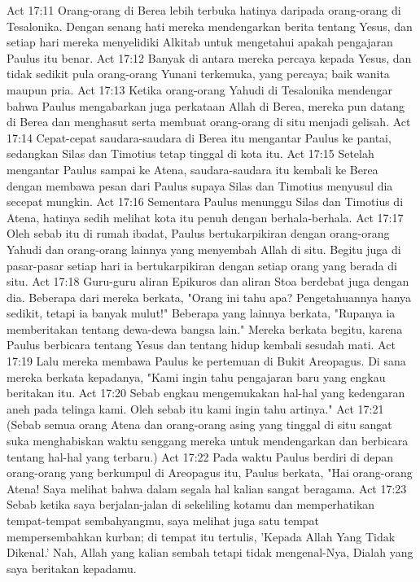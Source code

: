 Act 17:11  Orang-orang di Berea lebih terbuka hatinya daripada orang-orang di Tesalonika. Dengan senang hati mereka mendengarkan berita tentang Yesus, dan setiap hari mereka menyelidiki Alkitab untuk mengetahui apakah pengajaran Paulus itu benar.
Act 17:12  Banyak di antara mereka percaya kepada Yesus, dan tidak sedikit pula orang-orang Yunani terkemuka, yang percaya; baik wanita maupun pria.
Act 17:13  Ketika orang-orang Yahudi di Tesalonika mendengar bahwa Paulus mengabarkan juga perkataan Allah di Berea, mereka pun datang di Berea dan menghasut serta membuat orang-orang di situ menjadi gelisah.
Act 17:14  Cepat-cepat saudara-saudara di Berea itu mengantar Paulus ke pantai, sedangkan Silas dan Timotius tetap tinggal di kota itu.
Act 17:15  Setelah mengantar Paulus sampai ke Atena, saudara-saudara itu kembali ke Berea dengan membawa pesan dari Paulus supaya Silas dan Timotius menyusul dia secepat mungkin.
Act 17:16  Sementara Paulus menunggu Silas dan Timotius di Atena, hatinya sedih melihat kota itu penuh dengan berhala-berhala.
Act 17:17  Oleh sebab itu di rumah ibadat, Paulus bertukarpikiran dengan orang-orang Yahudi dan orang-orang lainnya yang menyembah Allah di situ. Begitu juga di pasar-pasar setiap hari ia bertukarpikiran dengan setiap orang yang berada di situ.
Act 17:18  Guru-guru aliran Epikuros dan aliran Stoa berdebat juga dengan dia. Beberapa dari mereka berkata, "Orang ini tahu apa? Pengetahuannya hanya sedikit, tetapi ia banyak mulut!" Beberapa yang lainnya berkata, "Rupanya ia memberitakan tentang dewa-dewa bangsa lain." Mereka berkata begitu, karena Paulus berbicara tentang Yesus dan tentang hidup kembali sesudah mati.
Act 17:19  Lalu mereka membawa Paulus ke pertemuan di Bukit Areopagus. Di sana mereka berkata kepadanya, "Kami ingin tahu pengajaran baru yang engkau beritakan itu.
Act 17:20  Sebab engkau mengemukakan hal-hal yang kedengaran aneh pada telinga kami. Oleh sebab itu kami ingin tahu artinya."
Act 17:21  (Sebab semua orang Atena dan orang-orang asing yang tinggal di situ sangat suka menghabiskan waktu senggang mereka untuk mendengarkan dan berbicara tentang hal-hal yang terbaru.)
Act 17:22  Pada waktu Paulus berdiri di depan orang-orang yang berkumpul di Areopagus itu, Paulus berkata, "Hai orang-orang Atena! Saya melihat bahwa dalam segala hal kalian sangat beragama.
Act 17:23  Sebab ketika saya berjalan-jalan di sekeliling kotamu dan memperhatikan tempat-tempat sembahyangmu, saya melihat juga satu tempat mempersembahkan kurban; di tempat itu tertulis, 'Kepada Allah Yang Tidak Dikenal.' Nah, Allah yang kalian sembah tetapi tidak mengenal-Nya, Dialah yang saya beritakan kepadamu.
